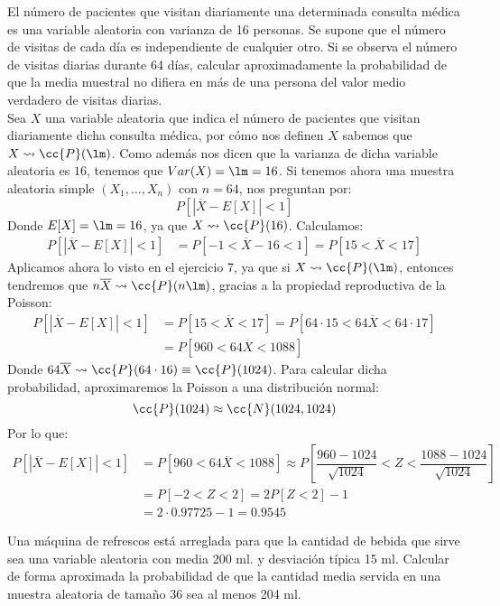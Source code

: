 \begin{ejercicio}
    El número de pacientes que visitan diariamente una determinada consulta médica es una variable aleatoria con varianza de 16 personas. Se supone que el número de visitas de cada día es independiente de cualquier otro. Si se observa el número de visitas diarias durante 64 días, calcular aproximadamente la probabilidad de que la media muestral no difiera en más de una persona del valor medio verdadero de visitas diarias.\\

    \noindent
    Sea $X$ una variable aleatoria que indica el número de pacientes que visitan diariamente dicha consulta médica, por cómo nos definen $X$ sabemos que $X\rightsquigarrow\cc{P}(\lm)$. Como además nos dicen que la varianza de dicha variable aleatoria es $16$, tenemos que $Var(X) = \lm = 16$. Si tenemos ahora una muestra aleatoria simple $(X_1, \ldots, X_n)$ con $n=64$, nos preguntan por:
    \begin{equation*}
        P[|\overline{X} - E[X]| < 1]
    \end{equation*}
    Donde $E[X] = \lm = 16$, ya que $X\rightsquigarrow\cc{P}(16)$. Calculamos:
    \begin{align*}
        P[|\overline{X} - E[X]| < 1] &= P[-1 < \overline{X}-16 < 1] = P[15 < \overline{X} < 17]
    \end{align*}
    Aplicamos ahora lo visto en el ejercicio 7, ya que si $X\rightsquigarrow\cc{P}(\lm)$, entonces tendremos que $n\overline{X}\rightsquigarrow \cc{P}(n\lm)$, gracias a la propiedad reproductiva de la Poisson:
    \begin{align*}
        P[|\overline{X} - E[X]| < 1] &= P[15 < \overline{X} < 17] = P[64\cdot 15 < 64\overline{X}<64\cdot 17] \\
                                     &= P[960 < 64\overline{X} < 1088]
    \end{align*}
    Donde $64\overline{X}\rightsquigarrow\cc{P}(64\cdot 16) \equiv \cc{P}(1024)$. Para calcular dicha probabilidad, aproximaremos la Poisson a una distribución normal:
    \begin{equation*}
        \cc{P}(1024) \approx \cc{N}(1024, 1024)
    \end{equation*}
    Por lo que:
    \begin{align*}
        P[|\overline{X} - E[X]| < 1] &= P[960 < 64\overline{X} < 1088] \approx P\left[\dfrac{960-1024}{\sqrt{1024}} < Z < \dfrac{1088 - 1024}{\sqrt{1024}}\right] \\
                                     &= P[-2 < Z < 2] = 2P[Z<2] -1  \\
                                     &= 2\cdot 0.97725 - 1 = 0.9545
    \end{align*}
\end{ejercicio}

\begin{ejercicio}   %
    Una máquina de refrescos está arreglada para que la cantidad de bebida que sirve sea una variable aleatoria con media 200 ml. y desviación típica 15 ml. Calcular de forma aproximada la probabilidad de que la cantidad media servida en una muestra aleatoria de tamaño 36 sea al menos 204 ml.
\end{ejercicio}

